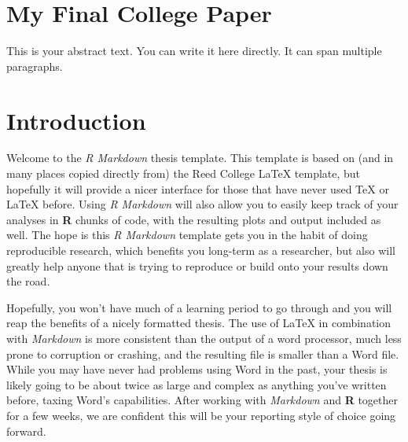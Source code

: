 \documentclass[
  letterpaper,
  12pt,
  twoside]{book}
\renewcommand*\contentsname{Table of contents}
\newcommand\contentsname{Table of contents}
\begin{document}
\makeatother

\cleardoublepage

\frontmatter
\pagestyle{empty}

\mainmatter

\renewcommand*\contentsname{Table of contents}
{
\setcounter{tocdepth}{1}
\tableofcontents
}
\listoffigures
\listoftables

\mainmatter
{}

\chapter{My Final College Paper}\label{my-final-college-paper}

This is your abstract text. You can write it here directly. It can span
multiple paragraphs.

\hfill\break


\chapter*{Introduction}\label{introduction}


Welcome to the \emph{R Markdown} thesis template. This template is based
on (and in many places copied directly from) the Reed College LaTeX
template, but hopefully it will provide a nicer interface for those that
have never used TeX or LaTeX before. Using \emph{R Markdown} will also
allow you to easily keep track of your analyses in \textbf{R} chunks of
code, with the resulting plots and output included as well. The hope is
this \emph{R Markdown} template gets you in the habit of doing
reproducible research, which benefits you long-term as a researcher, but
also will greatly help anyone that is trying to reproduce or build onto
your results down the road.

Hopefully, you won't have much of a learning period to go through and
you will reap the benefits of a nicely formatted thesis. The use of
LaTeX in combination with \emph{Markdown} is more consistent than the
output of a word processor, much less prone to corruption or crashing,
and the resulting file is smaller than a Word file. While you may have
never had problems using Word in the past, your thesis is likely going
to be about twice as large and complex as anything you've written
before, taxing Word's capabilities. After working with \emph{Markdown}
and \textbf{R} together for a few weeks, we are confident this will be
your reporting style of choice going forward.
\end{document}
